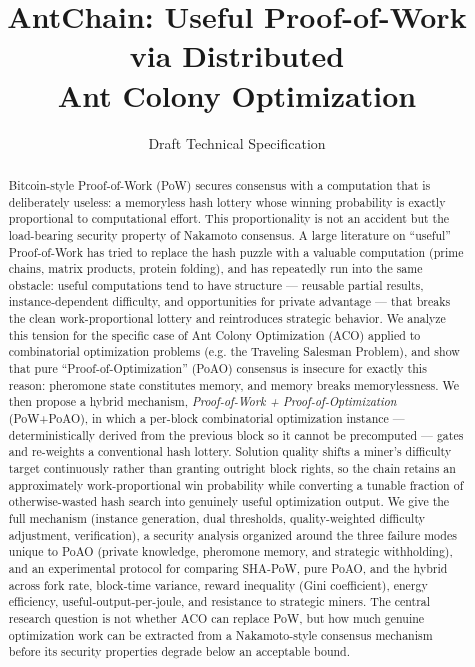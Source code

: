 \documentclass[journal]{IEEEtran}
\title{AntChain: Useful Proof-of-Work via Distributed\\Ant Colony Optimization}
\author{Draft Technical Specification}
\begin{document}
\maketitle

\begin{abstract}
Bitcoin-style Proof-of-Work (PoW) secures consensus with a computation that is
deliberately useless: a memoryless hash lottery whose winning probability is
exactly proportional to computational effort. This proportionality is not an
accident but the load-bearing security property of Nakamoto consensus. A large
literature on ``useful'' Proof-of-Work has tried to replace the hash puzzle with
a valuable computation (prime chains, matrix products, protein folding), and has
repeatedly run into the same obstacle: useful computations tend to have
structure --- reusable partial results, instance-dependent difficulty, and
opportunities for private advantage --- that breaks the clean
work-proportional lottery and reintroduces strategic behavior. We analyze this
tension for the specific case of Ant Colony Optimization (ACO) applied to
combinatorial optimization problems (e.g. the Traveling Salesman Problem), and
show that pure ``Proof-of-Optimization'' (PoAO) consensus is insecure for
exactly this reason: pheromone state constitutes memory, and memory breaks
memorylessness. We then propose a hybrid mechanism, \emph{Proof-of-Work +
Proof-of-Optimization} (PoW+PoAO), in which a per-block combinatorial
optimization instance --- deterministically derived from the previous block so
it cannot be precomputed --- gates and re-weights a conventional hash lottery.
Solution quality shifts a miner's difficulty target continuously rather than
granting outright block rights, so the chain retains an approximately
work-proportional win probability while converting a tunable fraction of
otherwise-wasted hash search into genuinely useful optimization output. We
give the full mechanism (instance generation, dual thresholds, quality-weighted
difficulty adjustment, verification), a security analysis organized around the
three failure modes unique to PoAO (private knowledge, pheromone memory, and
strategic withholding), and an experimental protocol for comparing SHA-PoW,
pure PoAO, and the hybrid across fork rate, block-time variance, reward
inequality (Gini coefficient), energy efficiency, useful-output-per-joule, and
resistance to strategic miners. The central research question is not whether
ACO can replace PoW, but how much genuine optimization work can be extracted
from a Nakamoto-style consensus mechanism before its security properties
degrade below an acceptable bound.


\end{abstract}
\end{document}
